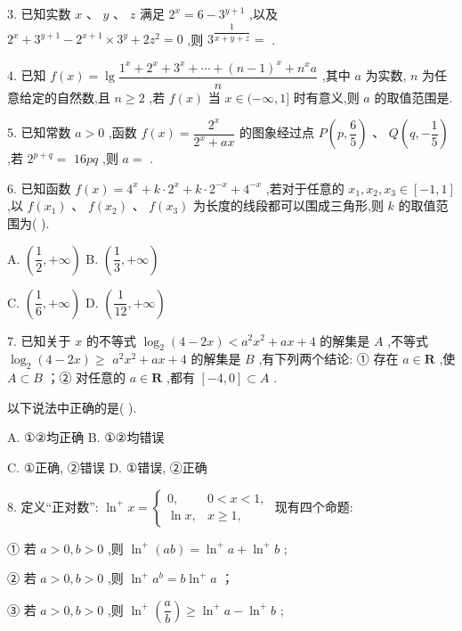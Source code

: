 3. 已知实数 $x$ 、 $y$ 、 $z$ 满足 ${2}^{x} = 6 - {3}^{y + 1}$ ,以及 ${2}^{x} + {3}^{y + 1} - {2}^{x + 1} \times  {3}^{y} + 2{z}^{2} = 0$ ,则 ${3}^{\dfrac{1}{x + y + z}} =$ \blkda{}.

4. 已知 $f\left( x\right)  = \lg \dfrac{{1}^{x} + {2}^{x} + {3}^{x} + \cdots  + {\left( n - 1\right) }^{x} + {n}^{x}a}{n}$ ,其中 $a$ 为实数, $n$ 为任意给定的自然数,且 $n \geq  2$ ,若 $f\left( x\right)$ 当 $x \in  ( - \infty ,1\rbrack$ 时有意义,则 $a$ 的取值范围是\blkda{}.

5. 已知常数 $a > 0$ ,函数 $f\left( x\right)  = \dfrac{{2}^{x}}{{2}^{x} + {ax}}$ 的图象经过点 $P\left( {p,\dfrac{6}{5}}\right) \text{ 、 }Q\left( {q, - \dfrac{1}{5}}\right)$ ,若 ${2}^{p + q} =$  ${16pq}$ ,则 $a =$ \blkda{}.

6. 已知函数 $f\left( x\right)  = {4}^{x} + k \cdot  {2}^{x} + k \cdot  {2}^{-x} + {4}^{-x}$ ,若对于任意的 ${x}_{1},{x}_{2},{x}_{3} \in  \left\lbrack  {-1,1}\right\rbrack$ ,以 $f\left( {x}_{1}\right)$ 、 $f\left( {x}_{2}\right)$ 、 $f\left( {x}_{3}\right)$ 为长度的线段都可以围成三角形,则 $k$ 的取值范围为(   ).

A. $\left( {\dfrac{1}{2}, + \infty }\right)$ B. $\left( {\dfrac{1}{3}, + \infty }\right)$

C. $\left( {\dfrac{1}{6}, + \infty }\right)$ D. $\left( {\dfrac{1}{12}, + \infty }\right)$

7. 已知关于 $x$ 的不等式 ${\log }_{2}\left( {4 - {2x}}\right)  < {a}^{2}{x}^{2} + {ax} + 4$ 的解集是 $A$ ,不等式 ${\log }_{2}\left( {4 - {2x}}\right)  \geq$  ${a}^{2}{x}^{2} + {ax} + 4$ 的解集是 $B$ ,有下列两个结论: ① 存在 $a \in  \mathbf{R}$ ,使 $A \subset  B$ ；② 对任意的 $a \in  \mathbf{R}$ ,都有 $\left\lbrack  {-4,0}\right\rbrack   \subset  A$ .

以下说法中正确的是(   ).

A. ①②均正确 B. ①②均错误

C. ①正确, ②错误 D. ①错误, ②正确

8. 定义“正对数”: ${\ln }^{ + }x = \left\{  \begin{array}{ll} 0, & 0 < x < 1, \\  \ln x, & x \geq  1, \end{array}\right.$ 现有四个命题:

① 若 $a > 0,b > 0$ ,则 ${\ln }^{ + }\left( {ab}\right)  = {\ln }^{ + }a + {\ln }^{ + }b$ ;

② 若 $a > 0,b > 0$ ,则 ${\ln }^{ + }{a}^{b} = b{\ln }^{ + }a$ ；

③ 若 $a > 0,b > 0$ ,则 ${\ln }^{ + }\left( \dfrac{a}{b}\right)  \geq  {\ln }^{ + }a - {\ln }^{ + }b$ ;

